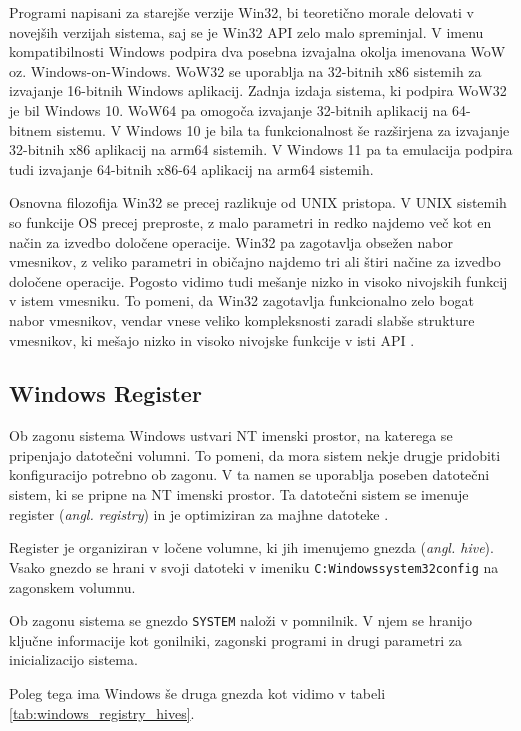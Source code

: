 \documentclass[a4paper,12pt,openright]{book}
\begin{document}
Programi napisani za starejše verzije Win32, bi teoretično morale delovati v novejših verzijah sistema, saj se je Win32 API zelo malo spreminjal.
V imenu kompatibilnosti Windows podpira dva posebna izvajalna okolja imenovana WoW oz. Windows-on-Windows.
WoW32 se uporablja na 32-bitnih x86 sistemih za izvajanje 16-bitnih Windows aplikacij. Zadnja izdaja sistema, ki podpira WoW32 je bil Windows 10.
WoW64 pa omogoča izvajanje 32-bitnih aplikacij na 64-bitnem sistemu.
V Windows 10 je bila ta funkcionalnost še razširjena za izvajanje 32-bitnih x86 aplikacij na arm64 sistemih.
V Windows 11 pa ta emulacija podpira tudi izvajanje 64-bitnih x86-64 aplikacij na arm64 sistemih.

Osnovna filozofija Win32 se precej razlikuje od UNIX pristopa.
V UNIX sistemih so funkcije OS precej preproste, z malo parametri in redko najdemo več kot en način za izvedbo določene operacije.
Win32 pa zagotavlja obsežen nabor vmesnikov, z veliko parametri in običajno najdemo tri ali štiri načine za izvedbo določene operacije.
Pogosto vidimo tudi mešanje nizko in visoko nivojskih funkcij v istem vmesniku.
To pomeni, da Win32 zagotavlja funkcionalno zelo bogat nabor vmesnikov, vendar vnese veliko kompleksnosti zaradi slabše strukture vmesnikov, ki mešajo nizko in visoko nivojske funkcije v isti API \cite{Tanenbaum_Bos_2023}.

\subsection{Windows Register}

Ob zagonu sistema Windows ustvari NT imenski prostor, na katerega se pripenjajo datotečni volumni.
To pomeni, da mora sistem nekje drugje pridobiti konfiguracijo potrebno ob zagonu.
V ta namen se uporablja poseben datotečni sistem, ki se pripne na NT imenski prostor.
Ta datotečni sistem se imenuje register (\textit{angl. registry}) in je optimiziran za majhne datoteke \cite{Tanenbaum_Bos_2023}.

Register je organiziran v ločene volumne, ki jih imenujemo gnezda (\textit{angl. hive}).
Vsako gnezdo se hrani v svoji datoteki v imeniku \texttt{C:Windowssystem32config} na zagonskem volumnu.

Ob zagonu sistema se gnezdo \texttt{SYSTEM} naloži v pomnilnik.
V njem se hranijo ključne informacije kot gonilniki, zagonski programi in drugi parametri za inicializacijo sistema.

Poleg tega ima Windows še druga gnezda kot vidimo v tabeli \ref{tab:windows_registry_hives}.
\end{document}
